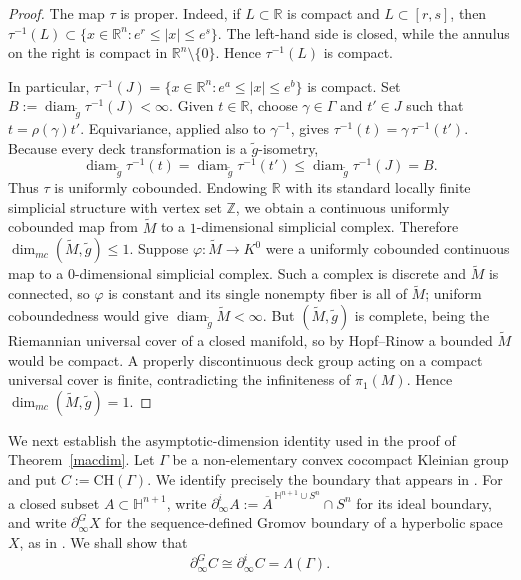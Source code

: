 \documentclass[12pt,oneside,a4paper]{article}
\theoremstyle{mytheorem}
\theoremstyle{remark}
\theoremstyle{definition}
\begin{document}
\begin{proof}
The map \(\tau\) is proper.  Indeed, if \(L\subset\mathbb R\) is
compact and \(L\subset[r,s]\), then
$\tau^{-1}(L)
 \subset
\{x\in\mathbb R^n:e^r\leq |x|\leq e^s\}.$ The left-hand side is closed,
while the annulus on the right is compact
in \(\mathbb R^n\setminus\{0\}\).  Hence \(\tau^{-1}(L)\) is compact.

In particular,
$\tau^{-1}(J)
 =
\{x\in\mathbb R^n:e^a\leq |x|\leq e^b\}$ is compact. Set
$B:=\operatorname{diam}_{\widetilde g}\tau^{-1}(J)<\infty.$
Given \(t\in\mathbb R\), choose \(\gamma\in\Gamma\) and \(t'\in J\)
such that \(t=\rho(\gamma)t'\).  Equivariance, applied also to
\(\gamma^{-1}\), gives $\tau^{-1}(t)=\gamma\,\tau^{-1}(t').$
Because every deck transformation is a
\(\widetilde g\)-isometry,
\[
 \operatorname{diam}_{\widetilde g}\tau^{-1}(t)
 =
 \operatorname{diam}_{\widetilde g}\tau^{-1}(t')
 \leq
 \operatorname{diam}_{\widetilde g}\tau^{-1}(J)
 =B.
\]
Thus \(\tau\) is uniformly cobounded.  Endowing \(\mathbb R\) with its
standard locally finite simplicial structure with vertex set
\(\mathbb Z\), we obtain a continuous uniformly cobounded map from
\(\widetilde M\) to a \(1\)-dimensional simplicial complex.  Therefore
$ \dim_{mc}(\widetilde M,\widetilde g)\leq1.$
Suppose \(\varphi\colon\widetilde M\to K^{0}\) were a uniformly
cobounded continuous map to a \(0\)-dimensional simplicial complex.
Such a complex is discrete and \(\widetilde M\) is connected, so
\(\varphi\) is constant and its single nonempty fiber is all of
\(\widetilde M\); uniform coboundedness would give
\(\operatorname{diam}_{\widetilde g}\widetilde M<\infty\).  But
\((\widetilde M,\widetilde g)\) is complete, being the Riemannian
universal cover of a closed manifold, so by Hopf--Rinow a bounded
\(\widetilde M\) would be compact. A properly discontinuous deck group acting
on a compact universal cover is finite, contradicting the infiniteness of
\(\pi_1(M)\). Hence \(\dim_{mc}(\widetilde M,\widetilde g)=1\).
\end{proof}

We next establish the asymptotic-dimension identity used in the proof of
Theorem~\ref{macdim}. Let $\Gamma$ be a non-elementary convex cocompact
Kleinian group and put $C:=\mathrm{CH}(\Gamma)$. We identify precisely the
boundary that appears in \cite[Theorem~6.4]{zbMATH05232578}. For a closed
subset \(A\subset\mathbb H^{n+1}\), write
$\partial_\infty^{i}A
 :=
\overline A^{\,\mathbb H^{n+1}\cup S^n}\cap S^n$ for its ideal boundary,
and write \(\partial_\infty^{G}X\) for the
sequence-defined Gromov boundary of a hyperbolic space \(X\), as in
\cite[\S~6.1]{zbMATH05232578}. We shall show that
\[
 \partial_\infty^{G}C\cong\partial_\infty^{i}C=\Lambda(\Gamma).
\]
\end{document}

